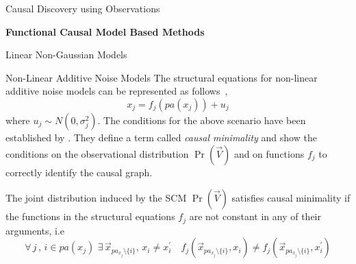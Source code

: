 \documentclass[10pt]{article}
\begin{document}
\begin{psection}[3]{Causal Discovery using Observations}
\begin{psubsection}{\textbf{Functional Causal Model Based Methods}}
\begin{pssubsection}{Linear Non-Gaussian Models}
        \end{pssubsection}
        
        \begin{pssubsection}{Non-Linear Additive Noise Models}
            The structural equations for non-linear additive noise models can be
            represented as follows~\cite{eberhardt2017introduction},
            \begin{equation}
                x_j = f_j (pa(x_j)) +  u_j
            \end{equation}
            where $u_j \sim N(0, \sigma_j^2)$. The conditions for the above scenario
            have been established by \citet{peters2014causal}. They define a
            term called \textit{causal minimality} and show the conditions on the
            observational distribution $\Pr(\vec{V})$ and on functions $f_j$ to
            correctly identify the causal graph.
            \begin{definition} The joint distribution
                induced by the SCM $\Pr(\vec{V})$ satisfies causal minimality if the
                functions in the structural equations $f_j$ are not constant in any of
                their arguments, i.e 
            \begin{equation}
                \forall\, j \,, \,i  \in pa(x_j) \,\, \exists\, \vec{x}_{pa_{x_j}
                \setminus \{i\}},\,  x_i \neq x_i^{'} \quad f_j(\vec{x}_{pa_{x_j}
            \setminus \{i\}}, x_i) \neq f_j(\vec{x}_{pa_{x_j} \setminus \{i\}}, x_i^{'}) 
            \end{equation}
            \end{definition}
            

\end{pssubsection}
\end{psubsection}
\end{psection}
\end{document}
